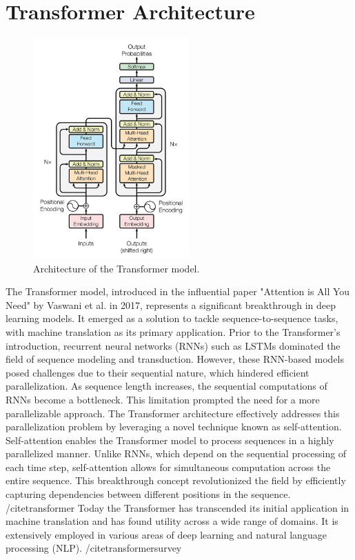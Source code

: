 \documentclass[a4paper,10pt]{report} %
\begin{document}
\section{Transformer Architecture}
\begin{figure}
  \centering
  \includegraphics[width=6cm]{img/transformer.png}
  \caption{Architecture of the Transformer model.}
  \label{fig:transformer}
\end{figure}
The Transformer model, introduced in the influential paper "Attention is All You Need" by Vaswani et al. in 2017, represents a significant breakthrough in deep learning models. It emerged as a solution to tackle sequence-to-sequence tasks, with machine translation as its primary application. Prior to the Transformer's introduction, recurrent neural networks (RNNs) such as LSTMs dominated the field of sequence modeling and transduction. However, these RNN-based models posed challenges due to their sequential nature, which hindered efficient parallelization. As sequence length increases, the sequential computations of RNNs become a bottleneck. This limitation prompted the need for a more parallelizable approach. The Transformer architecture effectively addresses this parallelization problem by leveraging a novel technique known as self-attention. Self-attention enables the Transformer model to process sequences in a highly parallelized manner. Unlike RNNs, which depend on the sequential processing of each time step, self-attention allows for simultaneous computation across the entire sequence. This breakthrough concept revolutionized the field by efficiently capturing dependencies between different positions in the sequence. /cite{transformer} Today the Transformer has transcended its initial application in machine translation and has found utility across a wide range of domains. It is extensively employed in various areas of deep learning and natural language processing (NLP). /cite{transformersurvey}
\end{document}
